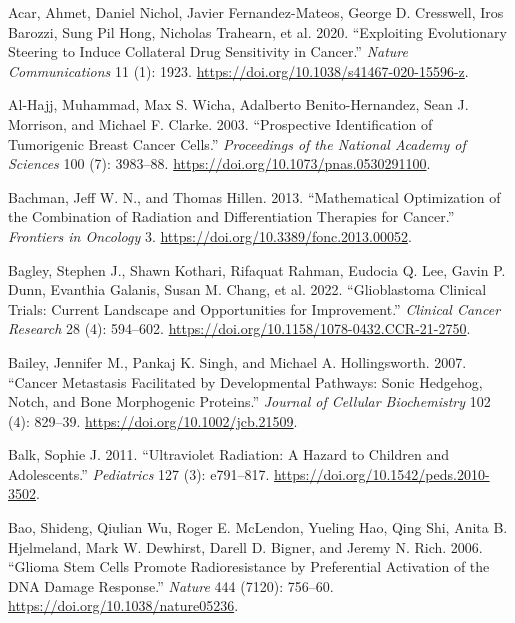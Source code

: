 \documentclass[
  letterpaper,
]{scrreprt}
\newlength{\cslhangindent}
\newenvironment{CSLReferences}[2] %
 {\begin{list}{}{%
  \setlength{\itemindent}{0pt}
  \setlength{\leftmargin}{0pt}
  \setlength{\parsep}{0pt}
  \ifodd #1
   \setlength{\leftmargin}{\cslhangindent}
   \setlength{\itemindent}{-1\cslhangindent}
  \fi
  \setlength{\itemsep}{#2\baselineskip}}}
 {\end{list}}
\theoremstyle{definition}
\theoremstyle{remark}
\begin{document}
\label{refs}
\begin{CSLReferences}{1}{0}
Acar, Ahmet, Daniel Nichol, Javier Fernandez-Mateos, George D.
Cresswell, Iros Barozzi, Sung Pil Hong, Nicholas Trahearn, et al. 2020.
{``Exploiting Evolutionary Steering to Induce Collateral Drug
Sensitivity in Cancer.''} \emph{Nature Communications} 11 (1): 1923.
\url{https://doi.org/10.1038/s41467-020-15596-z}.

Al-Hajj, Muhammad, Max S. Wicha, Adalberto Benito-Hernandez, Sean J.
Morrison, and Michael F. Clarke. 2003. {``Prospective Identification of
Tumorigenic Breast Cancer Cells.''} \emph{Proceedings of the National
Academy of Sciences} 100 (7): 3983--88.
\url{https://doi.org/10.1073/pnas.0530291100}.

Bachman, Jeff W. N., and Thomas Hillen. 2013. {``Mathematical
Optimization of the Combination of Radiation and Differentiation
Therapies for Cancer.''} \emph{Frontiers in Oncology} 3.
\url{https://doi.org/10.3389/fonc.2013.00052}.

Bagley, Stephen J., Shawn Kothari, Rifaquat Rahman, Eudocia Q. Lee,
Gavin P. Dunn, Evanthia Galanis, Susan M. Chang, et al. 2022.
{``Glioblastoma Clinical Trials: Current Landscape and Opportunities for
Improvement.''} \emph{Clinical Cancer Research} 28 (4): 594--602.
\url{https://doi.org/10.1158/1078-0432.CCR-21-2750}.

Bailey, Jennifer M., Pankaj K. Singh, and Michael A. Hollingsworth.
2007. {``Cancer Metastasis Facilitated by Developmental Pathways: Sonic
Hedgehog, Notch, and Bone Morphogenic Proteins.''} \emph{Journal of
Cellular Biochemistry} 102 (4): 829--39.
\url{https://doi.org/10.1002/jcb.21509}.

Balk, Sophie J. 2011. {``Ultraviolet Radiation: A Hazard to Children and
Adolescents.''} \emph{Pediatrics} 127 (3): e791--817.
\url{https://doi.org/10.1542/peds.2010-3502}.

Bao, Shideng, Qiulian Wu, Roger E. McLendon, Yueling Hao, Qing Shi,
Anita B. Hjelmeland, Mark W. Dewhirst, Darell D. Bigner, and Jeremy N.
Rich. 2006. {``Glioma Stem Cells Promote Radioresistance by Preferential
Activation of the DNA Damage Response.''} \emph{Nature} 444 (7120):
756--60. \url{https://doi.org/10.1038/nature05236}.


\end{CSLReferences}
\end{document}
